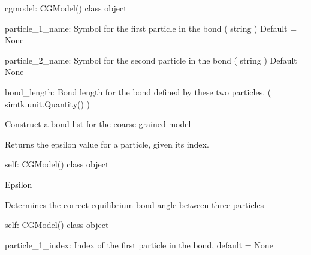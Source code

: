 \documentclass[letterpaper,12pt,english,openany,oneside]{sphinxmanual}
\begin{document}
\begin{fulllineitems}
\begin{fulllineitems}
cgmodel: CGModel() class object

particle\_1\_name: Symbol for the first particle in the bond
( string )
Default = None

particle\_2\_name: Symbol for the second particle in the bond
( string )
Default = None

bond\_length: Bond length for the bond defined by these two particles.
( simtk.unit.Quantity() )

\end{fulllineitems}


\begin{fulllineitems}
\label{\detokenize{cg_model:cg_model.cgmodel.CGModel.get_bond_list}}
Construct a bond list for the coarse grained model

\end{fulllineitems}


\begin{fulllineitems}
\label{\detokenize{cg_model:cg_model.cgmodel.CGModel.get_epsilon}}
Returns the epsilon value for a particle, given its index.

self: CGModel() class object

Epsilon

\end{fulllineitems}


\begin{fulllineitems}
\label{\detokenize{cg_model:cg_model.cgmodel.CGModel.get_equil_bond_angle}}
Determines the correct equilibrium bond angle between three particles

self: CGModel() class object

particle\_1\_index: Index of the first particle in the bond, default = None


\end{fulllineitems}
\end{fulllineitems}
\end{document}
